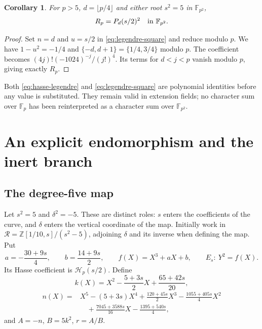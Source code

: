 \documentclass[11pt,a4paper]{article}
\newtheorem{corollary}[theorem]{Corollary}
\theoremstyle{remark}
\newcommand{\Z}{\mathbb Z}
\newcommand{\Fp}{\mathbb F_p}
\newcommand{\Fpp}{\mathbb F_{p^2}}
\begin{document}
\begin{corollary}\label{cor:quartic}
For $p>5$, $d=\lfloor p/4\rfloor$ and either root $s^2=5$ in
$\Fpp$,
\begin{equation}\label{eq:quartic-square}
 R_p=P_d(s/2)^2\quad\hbox{in }\Fpp.
\end{equation}
\end{corollary}
\begin{proof}
Set $n=d$ and $u=s/2$ in \eqref{eq:legendre-square} and reduce
modulo $p$. We have $1-u^2=-1/4$ and
$\{-d,d+1\}=\{1/4,3/4\}$ modulo $p$. The coefficient becomes
$(4j)!(-1024)^{-j}/(j!)^4$. Its terms for $d<j<p$ vanish modulo
$p$, giving exactly $R_p$.
\end{proof}

Both \eqref{eq:hasse-legendre} and \eqref{eq:legendre-square} are
polynomial identities before any value is substituted. They remain
valid in extension fields; no character sum over $\Fp$ has been
reinterpreted as a character sum over $\Fpp$.

\section{An explicit endomorphism and the inert branch}\label{sec:inert}
\subsection{The degree-five map}
Let $s^2=5$ and $\delta^2=-5$. These are distinct roles: $s$ enters
the coefficients of the curve, and $\delta$ enters the vertical
coordinate of the map. Initially work in
$\mathcal R=\Z[1/10,s]/(s^2-5)$, adjoining $\delta$ and its inverse
when defining the map. Put
\begin{equation}\label{eq:elliptic-curve}
 a=-\frac{30+9s}{4},\qquad b=\frac{14+9s}{2},\qquad
 f(X)=X^3+aX+b,\qquad E_s:\ Y^2=f(X).
\end{equation}
Its Hasse coefficient is $\mathcal H_p(s/2)$. Define
\begin{equation}\label{eq:kernel-polynomial}
 k(X)=X^2-\frac{5+3s}{2}X+\frac{65+42s}{20},
\end{equation}
\begin{equation}\label{eq:numerator}
\begin{split}
 n(X)={}&X^5-(5+3s)X^4+\frac{120+45s}{2}X^3
       -\frac{1055+405s}{4}X^2\\
       &\quad+\frac{7045+3588s}{16}X-\frac{1395+540s}{4},
\end{split}
\end{equation}
and $A=-n$, $B=5k^2$, $r=A/B$.
\end{document}
